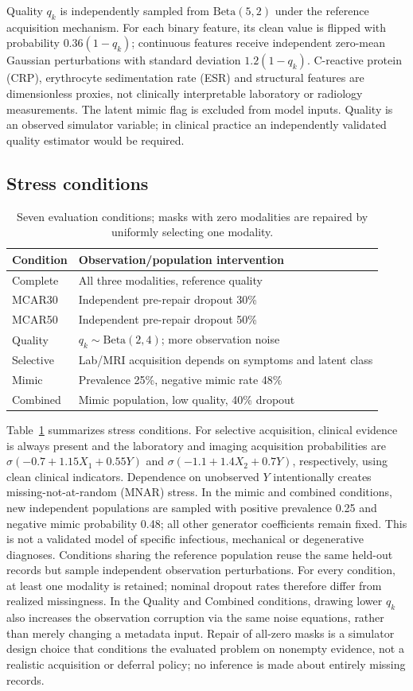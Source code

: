 \documentclass[conference]{IEEEtran}
\begin{document}
Quality $q_k$ is independently sampled from $\mathrm{Beta}(5,2)$ under the reference acquisition mechanism. For each binary feature, its clean value is flipped with probability $0.36(1-q_k)$; continuous features receive independent zero-mean Gaussian perturbations with standard deviation $1.2(1-q_k)$. C-reactive protein (CRP), erythrocyte sedimentation rate (ESR) and structural features are dimensionless proxies, not clinically interpretable laboratory or radiology measurements. The latent mimic flag is excluded from model inputs. Quality is an observed simulator variable; in clinical practice an independently validated quality estimator would be required.
\subsection{Stress conditions}
\begin{table}[t]
\caption{Seven evaluation conditions; masks with zero modalities are repaired by uniformly selecting one modality.}
\label{tab:scen}
\centering\footnotesize
\begin{tabular}{@{}p{}p{}@{}}\toprule
Condition & Observation/population intervention\\\midrule
Complete & All three modalities, reference quality\\
MCAR30 & Independent pre-repair dropout 30\%\\
MCAR50 & Independent pre-repair dropout 50\%\\
Quality & $q_k\sim\mathrm{Beta}(2,4)$; more observation noise\\
Selective & Lab/MRI acquisition depends on symptoms and latent class\\
Mimic & Prevalence 25\%, negative mimic rate 48\%\\
Combined & Mimic population, low quality, 40\% dropout\\\bottomrule
\end{tabular}
\end{table}
Table~\ref{tab:scen} summarizes stress conditions. For selective acquisition, clinical evidence is always present and the laboratory and imaging acquisition probabilities are $\sigma(-0.7+1.15X_1+0.55Y)$ and $\sigma(-1.1+1.4X_2+0.7Y)$, respectively, using clean clinical indicators. Dependence on unobserved $Y$ intentionally creates missing-not-at-random (MNAR) stress. In the mimic and combined conditions, new independent populations are sampled with positive prevalence 0.25 and negative mimic probability 0.48; all other generator coefficients remain fixed. This is not a validated model of specific infectious, mechanical or degenerative diagnoses. Conditions sharing the reference population reuse the same held-out records but sample independent observation perturbations. For every condition, at least one modality is retained; nominal dropout rates therefore differ from realized missingness. In the Quality and Combined conditions, drawing lower $q_k$ also increases the observation corruption via the same noise equations, rather than merely changing a metadata input. Repair of all-zero masks is a simulator design choice that conditions the evaluated problem on nonempty evidence, not a realistic acquisition or deferral policy; no inference is made about entirely missing records.
\end{document}
